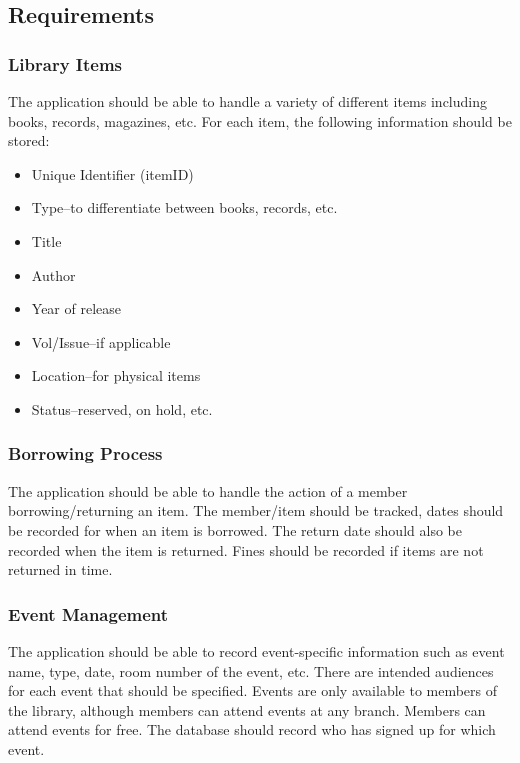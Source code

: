 \documentclass[11pt,a4paper]{article}
\begin{document}
\subsection{Requirements}

\subsubsection{Library Items}

The application should be able to handle a variety of different items including books, records, magazines, etc. For each item, the following information should be stored:


\begin{itemize}
    \item{Unique Identifier (itemID)}
    \item{Type--to differentiate between books, records, etc.}
    \item{Title}
    \item{Author}
    \item{Year of release}
    \item{Vol/Issue--if applicable}
    \item{Location--for physical items}
    \item{Status--reserved, on hold, etc.}
\end{itemize}

\subsubsection{Borrowing Process}

The application should be able to handle the action of a member borrowing/returning an item. The member/item should be tracked, dates should be recorded for when an item is borrowed. The return date should also be recorded when the item is returned. Fines should be recorded if items are not returned in time.

\subsubsection{Event Management}

The application should be able to record event-specific information such as event name, type, date, room number of the event, etc. There are intended audiences for each event that should be specified. Events are only available to members of the library, although members can attend events at any branch. Members can attend events for free. The database should record who has signed up for which event.
\end{document}
